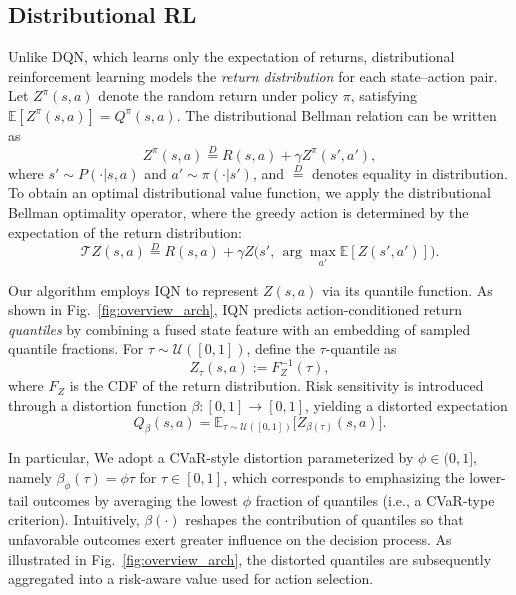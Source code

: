 \documentclass[runningheads]{llncs}
\begin{document}
\subsection{Distributional RL}
\label{sec:method_distRL}
Unlike DQN, which learns only the expectation of returns, distributional reinforcement learning models the \emph{return distribution} for each state--action pair. Let $Z^{\pi}(s,a)$ denote the random return under policy $\pi$, satisfying $\mathbb{E}[Z^{\pi}(s,a)] = Q^{\pi}(s,a)$. The distributional Bellman relation can be written as
\begin{equation}
Z^{\pi}(s,a) \overset{D}{=} R(s,a) + \gamma Z^{\pi}(s',a'),
\label{eq:dist_bellman}
\end{equation}
where $s' \sim P(\cdot|s,a)$ and $a' \sim \pi(\cdot|s')$, and $\overset{D}{=}$ denotes equality in distribution.
To obtain an optimal distributional value function, we apply the distributional Bellman optimality operator, where the greedy action is determined by the expectation of the return distribution:
\begin{equation}
\mathcal{T}Z(s,a) \overset{D}{=} R(s,a) + \gamma Z\!\Big(s',\,\arg\max_{a'} \mathbb{E}[Z(s',a')]\Big).
\label{eq:dist_opt}
\end{equation}

Our algorithm employs IQN to represent $Z(s,a)$ via its quantile function. As shown in Fig.~\ref{fig:overview_arch}, IQN predicts action-conditioned return \emph{quantiles} by combining a fused state feature with an embedding of sampled quantile fractions.
For $\tau \sim \mathcal{U}([0,1])$, define the $\tau$-quantile as
\begin{equation}
Z_{\tau}(s,a) := F_Z^{-1}(\tau),
\label{eq:iqn_quantile}
\end{equation}
where $F_Z$ is the CDF of the return distribution. Risk sensitivity is introduced through a distortion function $\beta:[0,1]\rightarrow[0,1]$, yielding a distorted expectation
\begin{equation}
Q_{\beta}(s,a)
=
\mathbb{E}_{\tau \sim \mathcal{U}([0,1])}\Big[ Z_{\beta(\tau)}(s,a)\Big].
\label{eq:distorted_q}
\end{equation}

In particular, We adopt a CVaR-style distortion parameterized by $\phi\in(0,1]$, namely $\beta_{\phi}(\tau)=\phi\tau$ for $\tau\in[0,1]$,
which corresponds to emphasizing the lower-tail outcomes by averaging the lowest $\phi$ fraction of quantiles (i.e., a CVaR-type criterion). Intuitively, $\beta(\cdot)$ reshapes the contribution of quantiles so that unfavorable outcomes exert greater influence on the decision process. As illustrated in Fig.~\ref{fig:overview_arch}, the distorted quantiles are subsequently aggregated into a risk-aware value used for action selection.
\end{document}
